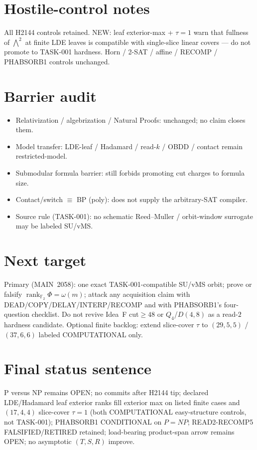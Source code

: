 \documentclass[11pt]{article}
\begin{document}
\section*{Hostile-control notes}
All H2144 controls retained. NEW: leaf exterior-max + $\tau{=}1$ warn that fullness of
$\bigwedge^2$ at finite LDE leaves is compatible with single-slice linear covers --- do not
promote to TASK-001 hardness. Horn / 2-SAT / affine / RECOMP / PHABSORB1 controls unchanged.

\section*{Barrier audit}
\begin{itemize}
\item Relativization / algebrization / Natural Proofs: unchanged; no claim closes them.
\item Model transfer: LDE-leaf / Hadamard / read-$k$ / OBDD / contact remain restricted-model.
\item Submodular formula barrier: still forbids promoting cut charges to formula size.
\item Contact/switch $\equiv$ BP (poly): does not supply the arbitrary-SAT compiler.
\item Source rule (TASK-001): no schematic Reed--Muller / orbit-window surrogate may be labeled SU/vMS.
\end{itemize}

\section*{Next target}
Primary (MAIN~2058): one exact TASK-001-compatible SU/vMS orbit; prove or falsify
$\operatorname{rank}_{\mathbb F_2}\Phi=\omega(m)$; attack any acquisition claim with
DEAD/COPY/DELAY/INTERP/RECOMP and with PHABSORB1's four-question checklist.
Do not revive Idea~F cut$\ge48$ or $Q_4$/$D(4,8)$ as a read-$2$ hardness candidate.
Optional finite backlog: extend slice-cover $\tau$ to $(29,5,5)$ / $(37,6,6)$ labeled COMPUTATIONAL only.

\section*{Final status sentence}
P versus NP remains OPEN; no commits after H2144 tip; declared LDE/Hadamard leaf exterior ranks fill exterior max on listed finite cases and $(17,4,4)$ slice-cover $\tau=1$ (both COMPUTATIONAL easy-structure controls, not TASK-001); PHABSORB1 CONDITIONAL on $P=NP$; READ2-RECOMP5 FALSIFIED/RETIRED retained; load-bearing product-span arrow remains OPEN; no asymptotic $(T,S,R)$ improve.
\end{document}

